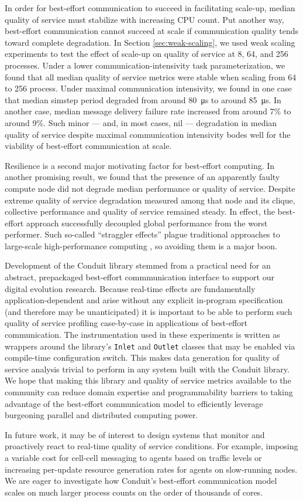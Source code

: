 In order for best-effort communication to succeed in facilitating scale-up, median quality of service must stabilize with increasing CPU count.
Put another way, best-effort communication cannot succeed at scale if communication quality tends toward complete degradation.
In Section \ref{sec:weak-scaling}, we used weak scaling experiments to test the effect of scale-up on quality of service at 8, 64, and 256 processes.
Under a lower communication-intensivity task parameterization, we found that all median quality of service metrics were stable when scaling from 64 to 256 process.
Under maximal communication intensivity, we found in one case that median simstep period degraded from around \SI{80}{\micro\second} to around \SI{85}{\micro\second}.
In another case, median message delivery failure rate increased from around 7\% to around 9\%.
Such minor --- and, in most cases, nil --- degradation in median quality of service despite maximal communication intensivity bodes well for the viability of best-effort communication at scale.

Resilience is a second major motivating factor for best-effort computing.
In another promising result, we found that the presence of an apparently faulty compute node did not degrade median performance or quality of service.
Despite extreme quality of service degradation measured among that node and its clique, collective performance and quality of service remained steady.
In effect, the best-effort approach successfully decoupled global performance from the worst performer.
Such so-called ``straggler effects'' plague traditional approaches to large-scale high-performance computing \citep{aktacs2019straggler}, so avoiding them is a major boon.

Development of the Conduit library stemmed from a practical need for an abstract, prepackaged best-effort commmunication interface to support our digital evolution research.
Because real-time effects are fundamentally application-dependent and arise without any explicit in-program specification (and therefore may be unanticipated) it is important to be able to perform such quality of service profiling case-by-case in applications of best-effort communication.
The instrumentation used in these experiments is written as wrappers around the library's \texttt{Inlet} and \texttt{Outlet} classes that may be enabled via compile-time configuration switch.
This makes data generation for quality of service analysis trivial to perform in any system built with the Conduit library.
We hope that making this library and quality of service metrics available to the community can reduce domain expertise and programmability barriers to taking advantage of the best-effort communication model to efficiently leverage burgeoning parallel and distributed computing power.

In future work, it may be of interest to design systems that monitor and proactively react to real-time quality of service conditions.
For example, imposing a variable cost for cell-cell messaging to agents based on traffic levels or increasing per-update resource generation rates for agents on slow-running nodes.
We are eager to investigate how Conduit's best-effort communication model scales on much larger process counts on the order of thousands of cores.
